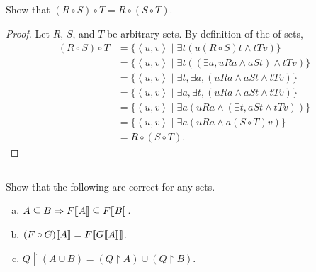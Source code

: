 \documentclass{report}
\begin{document}
\subsection{}%
\label{sub:exercise-3.21}

Show that $(R \circ S) \circ T = R \circ (S \circ T)$.

\begin{proof}

  Let $R$, $S$, and $T$ be arbitrary sets.
  By definition of the  of sets,
    \begin{align*}
      (R \circ S) \circ T
        & = \{\left< u, v \right> \mid
          \exists t(u(R \circ S)t \land tTv)\} \\
        & = \{\left< u, v \right> \mid
          \exists t((\exists a, uRa \land aSt) \land tTv)\} \\
        & = \{\left< u, v \right> \mid
          \exists t, \exists a, (uRa \land aSt \land tTv)\} \\
        & = \{\left< u, v \right> \mid
          \exists a, \exists t, (uRa \land aSt \land tTv)\} \\
        & = \{\left< u, v \right> \mid
          \exists a(uRa \land (\exists t, aSt \land tTv))\} \\
        & = \{\left< u, v \right> \mid \exists a(uRa \land a(S \circ T)v)\} \\
        & = R \circ (S \circ T).
    \end{align*}

\end{proof}

\subsection{}%
\label{sub:exercise-3.22}

Show that the following are correct for any sets.

\begin{enumerate}[(a)]
  \item $A \subseteq B \Rightarrow F\!\left\llbracket A\right\rrbracket \subseteq F\!\left\llbracket B\right\rrbracket$.
  \item $(F \circ G)\!\left\llbracket A\right\rrbracket = F\!\left\llbracket G\!\left\llbracket A\right\rrbracket\right\rrbracket$.
  \item $Q \restriction (A \cup B) =
    (Q \restriction A) \cup (Q \restriction B)$.
\end{enumerate}
\end{document}

